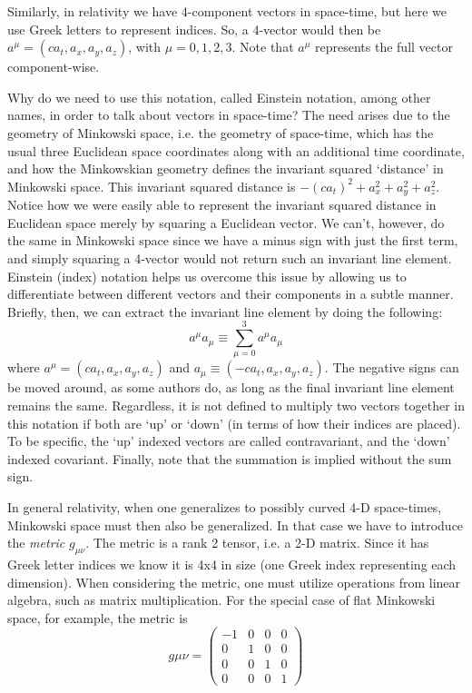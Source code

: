 \documentclass{emulateapj}
\begin{document}
Similarly, in relativity we have 4-component vectors in space-time, but here we use Greek letters to represent indices. So, a 4-vector would then be $a^\mu=(ca_t,a_x,a_y,a_z)$, with $\mu=0,1,2,3$. Note that $a^\mu$ represents the full vector component-wise. 

Why do we need to use this notation, called Einstein notation, among other names, in order to talk about vectors in space-time? The need arises due to the geometry of Minkowski space, i.e. the geometry of space-time, which has the usual three Euclidean space coordinates along with an additional time coordinate, and how the Minkowskian geometry defines the invariant squared `distance' in Minkowski space. This invariant squared distance is $-(ca_t)^2+a_x^2+a_y^2+a_z^2$. Notice how we were easily able to represent the invariant squared distance in Euclidean space merely by squaring a Euclidean vector. We can't, however, do the same in Minkowski space since we have a minus sign with just the first term, and simply squaring a 4-vector would not return such an invariant line element. Einstein (index) notation helps us overcome this issue by allowing us to differentiate between different vectors and their components in a subtle manner. Briefly, then, we can extract the invariant line element by doing the following:
\[ a^\mu a_\mu \equiv \sum_{\mu=0}^{3} a^\mu a_\mu\]
where $a^\mu=(ca_t,a_x,a_y,a_z)$ and $a_\mu\equiv(-ca_t,a_x,a_y,a_z)$. The negative signs can be moved around, as some authors do, as long as the final invariant line element remains the same. Regardless, it is not defined to multiply two vectors together in this notation if both are `up' or `down' (in terms of how their indices are placed). To be specific, the `up' indexed vectors are called contravariant, and the `down' indexed covariant. Finally, note that the summation is implied without the sum sign.

In general relativity, when one generalizes to possibly curved 4-D space-times, Minkowski space must then also be generalized. In that case we have to introduce the \textit{metric} $g_{\mu\nu}$. The metric is a rank 2 tensor, i.e. a 2-D matrix. Since it has Greek letter indices we know it is 4x4 in size (one Greek index representing each dimension). When considering the metric, one must utilize operations from linear algebra, such as matrix multiplication.
For the special case of flat Minkowski space, for example, the metric is
\[ g\mu\nu = \begin{pmatrix}
-1 & 0 & 0 & 0 \\ 
0 & 1 & 0 & 0 \\ 
0 & 0 & 1 & 0 \\ 
0 & 0 & 0 & 1
\end{pmatrix} \]
\end{document}
